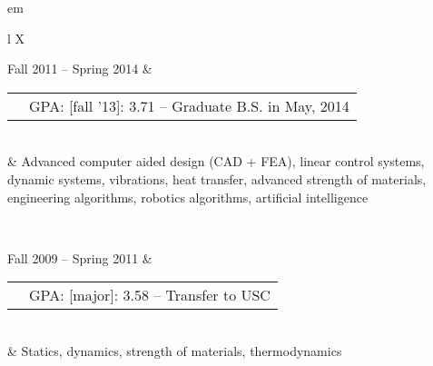 


	
{ em
\begin{tabu}{ L{\tabularIndent} X } \hhline{==}
	
	Fall 2011 -- Spring 2014 & 
	\begin{tabular}{ l | l }
		\mysubsection{University of Southern California} & GPA: [fall '13]: 3.71 -- Graduate B.S. in May, 2014 \\ \cline{1-1}
	\end{tabular}
	\\
	&
	Advanced computer aided design (CAD + FEA), linear control systems, dynamic systems, vibrations, heat transfer, advanced strength of materials, engineering algorithms, robotics algorithms, artificial intelligence

\\ \hhline{==}

	Fall 2009 -- Spring 2011 & 
	\begin{tabular}{ l | l }
		\mysubsection{University of Massachusetts, Amherst} & GPA: [major]: 3.58 -- Transfer to USC \\ \cline{1-1}
	\end{tabular}
	\\
	& Statics, dynamics, strength of materials, thermodynamics
\end{tabu}}